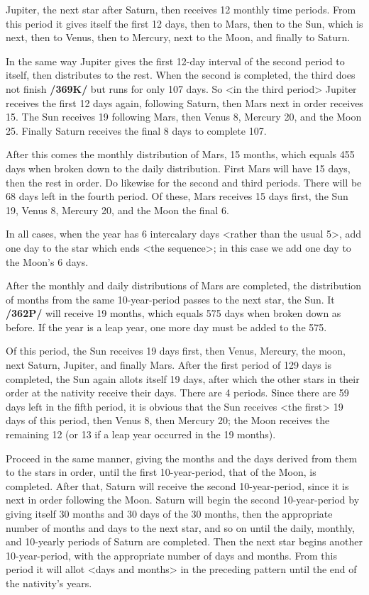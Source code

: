 Jupiter, the next star after Saturn, then receives 12 monthly time periods. From this period it gives itself the first 12 days, then to Mars, then to the Sun, which is next, then to Venus, then to Mercury, next to the Moon, and finally to Saturn. 

In the same way Jupiter gives the first 12-day interval of the second
period to itself, then distributes to the rest. When the second is completed, the third does not finish \textbf{/369K/} but runs for only 107 days. So <in the third period> Jupiter receives the first 12 days again, following Saturn, then Mars next in order receives 15. The Sun receives 19 following Mars, then Venus 8, Mercury 20, and the Moon 25. Finally Saturn receives the final 8 days to complete 107.

After this comes the monthly distribution of Mars, 15 months, which equals 455 days when broken down to the daily distribution. First Mars will have 15 days, then the rest in order. Do likewise for the
second and third periods. There will be 68 days left in the fourth period. Of these, Mars receives 15 days first, the Sun 19, Venus 8, Mercury 20, and the Moon the final 6. 

In all cases, when the year has 6 intercalary days <rather than the usual 5>, add one day to the star which ends <the sequence>; in this case we add one day to the Moon’s 6 days.

After the monthly and daily distributions of Mars are completed, the distribution of months from the same 10-year-period passes to the next star, the Sun. It \textbf{/362P/} will receive 19 months, which equals 575 days when broken down as before. If the year is a leap year, one more day must be added to the 575. 

Of this period, the Sun receives 19 days first, then Venus, Mercury, the moon, next Saturn, Jupiter, and finally Mars. After the first period of 129 days is completed, the Sun again allots itself 19 days, after which the other stars in their order at the nativity receive their days. There are 4 periods. Since there are 59 days left in the fifth period, it is obvious that the Sun receives <the first> 19 days of this period, then Venus 8, then Mercury 20; the Moon receives the remaining 12 (or 13 if a leap year occurred in the 19 months).

Proceed in the same manner, giving the months and the days derived from them to the stars in order, until the first 10-year-period, that of the Moon, is completed. After that, Saturn will receive the second 10-year-period, since it is next in order following the Moon. Saturn will begin the second 10-year-period by giving itself 30 months and 30 days of the 30 months, then the appropriate number of months and days to the next star, and so on until the daily, monthly, and 10-yearly periods of Saturn are completed. Then the next star begins another 10-year-period, with the appropriate number of days and months. From this period
it will allot <days and months> in the preceding pattern until the end of the nativity’s years. 

